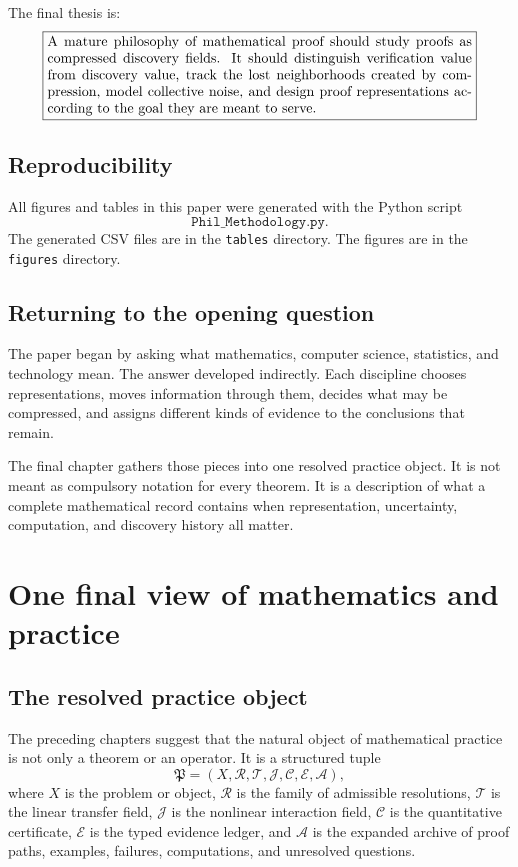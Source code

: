 \documentclass[11pt,oneside]{book}
\theoremstyle{remark}
\begin{document}
The final thesis is:
\[
\boxed{\begin{minipage}{0.88\linewidth}
A mature philosophy of mathematical proof should study proofs as compressed discovery fields.  It should distinguish verification value from discovery value, track the lost neighborhoods created by compression, model collective noise, and design proof representations according to the goal they are meant to serve.
\end{minipage}}
\]


\section{Reproducibility}

All figures and tables in this paper were generated with the Python script
\[
        \texttt{Phil\_Methodology.py}.
\]
The generated CSV files are in the \texttt{tables} directory.  The figures are in the \texttt{figures} directory.


\section*{Returning to the opening question}
The paper began by asking what mathematics, computer science, statistics, and technology mean.  The answer developed indirectly.  Each discipline chooses representations, moves information through them, decides what may be compressed, and assigns different kinds of evidence to the conclusions that remain.

The final chapter gathers those pieces into one resolved practice object.  It is not meant as compulsory notation for every theorem.  It is a description of what a complete mathematical record contains when representation, uncertainty, computation, and discovery history all matter.

\chapter{One final view of mathematics and practice}

\section{The resolved practice object}
The preceding chapters suggest that the natural object of mathematical practice is not only a theorem or an operator.  It is a structured tuple
\[
\mathfrak P
=(X,\mathcal R,\mathcal T,\mathcal J,\mathcal C,\mathcal E,\mathcal A),
\]
where \(X\) is the problem or object, \(\mathcal R\) is the family of admissible resolutions, \(\mathcal T\) is the linear transfer field, \(\mathcal J\) is the nonlinear interaction field, \(\mathcal C\) is the quantitative certificate, \(\mathcal E\) is the typed evidence ledger, and \(\mathcal A\) is the expanded archive of proof paths, examples, failures, computations, and unresolved questions.
\end{document}

